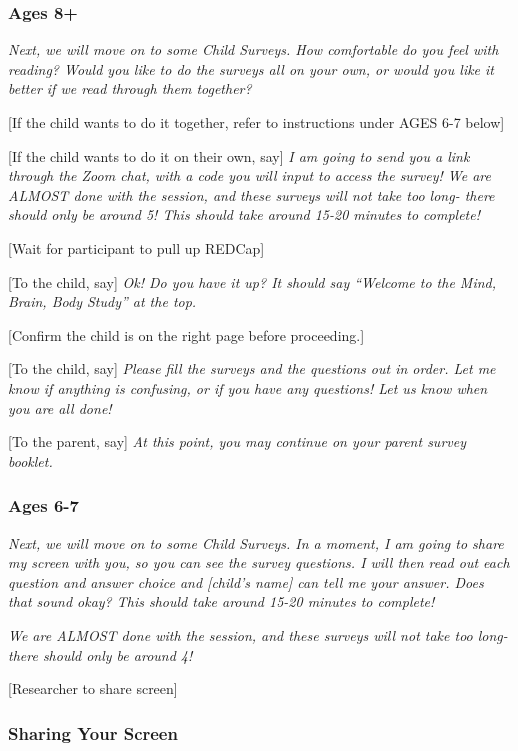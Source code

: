 \documentclass[]{book}
\begin{document}
\hypertarget{ages-8}{%
\subsubsection{Ages 8+}\label{ages-8}}

\emph{Next, we will move on to some Child Surveys. How comfortable do you feel with reading? Would you like to do the surveys all on your own, or would you like it better if we read through them together?}

{[}If the child wants to do it together, refer to instructions under AGES 6-7 below{]}

{[}If the child wants to do it on their own, say{]} \emph{I am going to send you a link through the Zoom chat, with a code you will input to access the survey! We are ALMOST done with the session, and these surveys will not take too long- there should only be around 5! This should take around 15-20 minutes to complete!}

{[}Wait for participant to pull up REDCap{]}

{[}To the child, say{]} \emph{Ok! Do you have it up? It should say ``Welcome to the Mind, Brain, Body Study'' at the top.}

{[}Confirm the child is on the right page before proceeding.{]}

{[}To the child, say{]} \emph{Please fill the surveys and the questions out in order. Let me know if anything is confusing, or if you have any questions! Let us know when you are all done!}

{[}To the parent, say{]} \emph{At this point, you may continue on your parent survey booklet.}

\hypertarget{ages-6-7}{%
\subsubsection{Ages 6-7}\label{ages-6-7}}

\emph{Next, we will move on to some Child Surveys. In a moment, I am going to share my screen with you, so you can see the survey questions. I will then read out each question and answer choice and {[}child's name{]} can tell me your answer. Does that sound okay? This should take around 15-20 minutes to complete!}

\emph{We are ALMOST done with the session, and these surveys will not take too long- there should only be around 4!}

{[}Researcher to share screen{]}

\hypertarget{sharing-your-screen}{%
\subsubsection{Sharing Your Screen}\label{sharing-your-screen}}
\end{document}
